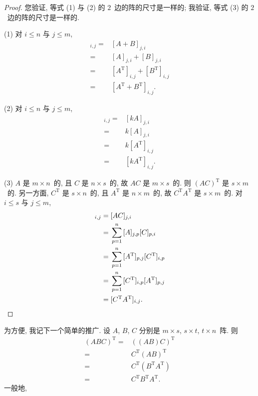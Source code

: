 \documentclass[../libro.tex]{subfiles}
\begin{document}
\begin{proof}
    您验证, 等式 (1) 与 (2) 的 \(2\)~边的阵的尺寸是一样的;
    我验证, 等式 (3) 的 \(2\)~边的阵的尺寸是一样的.

    (1)
    对 \(i \leq n\) 与 \(j \leq m\),
    \begin{align*}
        [(A + B)^{\mathrm{T}}]_{i,j}
        = {} &
        [A + B]_{j,i}
        \\
        = {} &
        [A]_{j,i} + [B]_{j,i}
        \\
        = {} &
        [A^{\mathrm{T}}]_{i,j} + [B^{\mathrm{T}}]_{i,j}
        \\
        = {} &
        [A^{\mathrm{T}} + B^{\mathrm{T}}]_{i,j}.
    \end{align*}

    (2)
    对 \(i \leq n\) 与 \(j \leq m\),
    \begin{align*}
        [(k A)^{\mathrm{T}}]_{i,j}
        = {} &
        [k A]_{j,i}
        \\
        = {} &
        k [A]_{j,i}
        \\
        = {} &
        k [A^{\mathrm{T}}]_{i,j}
        \\
        = {} &
        [k A^{\mathrm{T}}]_{i,j}.
    \end{align*}

    (3)
    \(A\) 是 \(m \times n\)~的,
    且 \(C\) 是 \(n \times s\)~的,
    故 \(AC\) 是 \(m \times s\)~的.
    则 \((AC)^{\mathrm{T}}\) 是 \(s \times m\)~的.
    另一方面,
    \(C^{\mathrm{T}}\) 是 \(s \times n\)~的,
    且 \(A^{\mathrm{T}}\) 是 \(n \times m\)~的,
    故 \(C^{\mathrm{T}} A^{\mathrm{T}}\) 是 \(s \times m\)~的.
    对 \(i \leq s\) 与 \(j \leq m\),
    \begin{align*}
        [(AC)^{\mathrm{T}}]_{i,j}
        = {} &
        [AC]_{j,i}
        \\
        = {} &
        \sum_{p=1}^{n} {[A]_{j,p} [C]_{p,i}}
        \\
        = {} &
        \sum_{p=1}^{n}
        {[A^{\mathrm{T}}]_{p,j} [C^{\mathrm{T}}]_{i,p}}
        \\
        = {} &
        \sum_{p=1}^{n}
        {[C^{\mathrm{T}}]_{i,p} [A^{\mathrm{T}}]_{p,j}}
        \\
        = {} &
        [C^{\mathrm{T}} A^{\mathrm{T}}]_{i,j}.
        \qedhere
    \end{align*}
\end{proof}

为方便, 我记下一个简单的推广.
设 \(A\), \(B\), \(C\) 分别是
\(m \times s\), \(s \times t\), \(t \times n\)~阵.
则
\begin{align*}
    (ABC)^{\mathrm{T}}
    = {} &
    ((AB) C)^{\mathrm{T}}
    \\
    = {} &
    C^{\mathrm{T}}
    (AB)^{\mathrm{T}}
    \\
    = {} &
    C^{\mathrm{T}}
    (B^{\mathrm{T}} A^{\mathrm{T}})
    \\
    = {} &
    C^{\mathrm{T}}
    B^{\mathrm{T}}
    A^{\mathrm{T}}.
\end{align*}
一般地,
\end{document}
